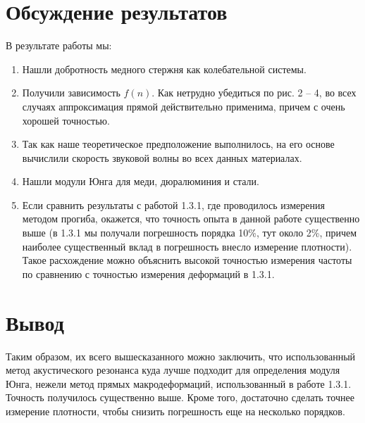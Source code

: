 \documentclass[a4, 12pt]{article}
\begin{document}
    \section{Обсуждение результатов}
    В результате работы мы:
    \begin{enumerate}
        \item Нашли добротность медного стержня как колебательной системы.
        \item Получили зависимость $f(n)$. Как нетрудно убедиться по рис. 2 -- 4,
        во всех случаях аппроксимация прямой действительно применима, причем с очень
        хорошей точностью.
        \item Так как наше теоретическое предположение выполнилось, на его основе
        вычислили скорость звуковой волны во всех данных материалах.
        \item Нашли модули Юнга для меди, дюралюминия и стали.
        \item Если сравнить результаты с работой 1.3.1, где
        проводилось измерения методом прогиба, окажется, что точность опыта в данной
        работе существенно выше (в 1.3.1 мы получали погрешность порядка 10\%, тут
        около 2\%, причем наиболее существенный вклад в погрешность внесло измерение
        плотности). Такое расхождение можно объяснить высокой точностью измерения
        частоты по сравнению с точностью измерения деформаций в 1.3.1.
    \end{enumerate}

    \section{Вывод}
    Таким образом, их всего вышесказанного можно заключить, что использованный
    метод акустического резонанса куда лучше подходит для определения модуля
    Юнга, нежели метод прямых макродеформаций, использованный в работе 1.3.1.
    Точность получилось существенно выше. Кроме того, достаточно сделать точнее
    измерение плотности, чтобы снизить погрешность еще на несколько порядков.
\end{document}
